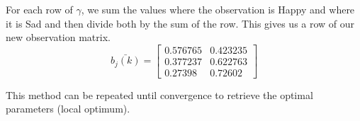 \begin{example}
        
        For each row of $\gamma$, we sum the values where the observation is Happy and where it is Sad and then divide both by the sum of the row. This gives us a row of our new observation matrix.
        \begin{equation}
            \bar{b_j(k)} = \begin{bmatrix}
                0.576765 & 0.423235 \\
                0.377237 & 0.622763 \\
                0.27398 & 0.72602
            \end{bmatrix}
        \end{equation} 

        This method can be repeated until convergence to retrieve the optimal parameters (local optimum).
    \end{example}

